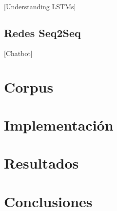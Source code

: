 \documentclass[12pt, letterpaper]{article}
\begin{document}
    [Understanding LSTMs]
    \subsection{Redes Seq2Seq}
    [Chatbot]

    \section{Corpus}
    \section{Implementación}

    \section{Resultados}
    \section{Conclusiones}

    \pagebreak
\end{document}
